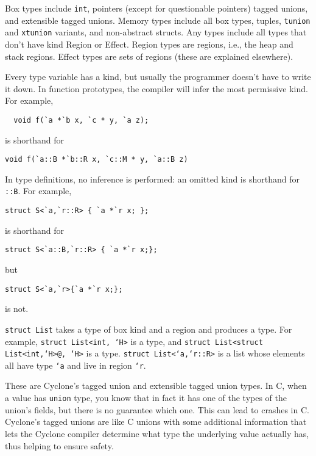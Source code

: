 Box types include \texttt{int}, pointers (except for questionable
pointers) tagged unions, and extensible tagged unions.
Memory types include all box types, tuples, \texttt{tunion} and
\texttt{xtunion} variants, and non-abstract structs.
Any types include all types that don't have kind Region or Effect.
Region types are regions, i.e., the heap and stack regions.
Effect types are sets of regions (these are explained elsewhere).


Every type variable has a kind, but usually the programmer doesn't
have to write it down.  In function prototypes, the compiler will
infer the most permissive kind.  For example,
\begin{verbatim}
  void f(`a *`b x, `c * y, `a z);
\end{verbatim}
is shorthand for
\begin{verbatim}
void f(`a::B *`b::R x, `c::M * y, `a::B z)
\end{verbatim}
In type definitions, no inference is performed: an omitted kind is
shorthand for \texttt{::B}.  For example,
\begin{verbatim}
struct S<`a,`r::R> { `a *`r x; };
\end{verbatim}
is shorthand for
\begin{verbatim}
struct S<`a::B,`r::R> { `a *`r x;};
\end{verbatim}
but
\begin{verbatim}
struct S<`a,`r>{`a *`r x;};
\end{verbatim}
is not.


\texttt{struct List} takes a type of box kind and a region and
produces a type.  For example, \texttt{struct List<int, `H>} is a
type, and \texttt{struct List<struct List<int,`H>@, `H>} is a type.
\texttt{struct List<`a,`r::R>} is a list whose elements all have type
\texttt{`a} and live in region \texttt{`r}.


These are Cyclone's tagged union and extensible tagged union types.
In C, when a value has \texttt{union} type, you know that in fact it
has one of the types of the union's fields, but there is no guarantee
which one.  This can lead to crashes in C\@.  Cyclone's tagged unions
are like C unions with some additional information that lets the
Cyclone compiler determine what type the underlying value actually
has, thus helping to ensure safety.

